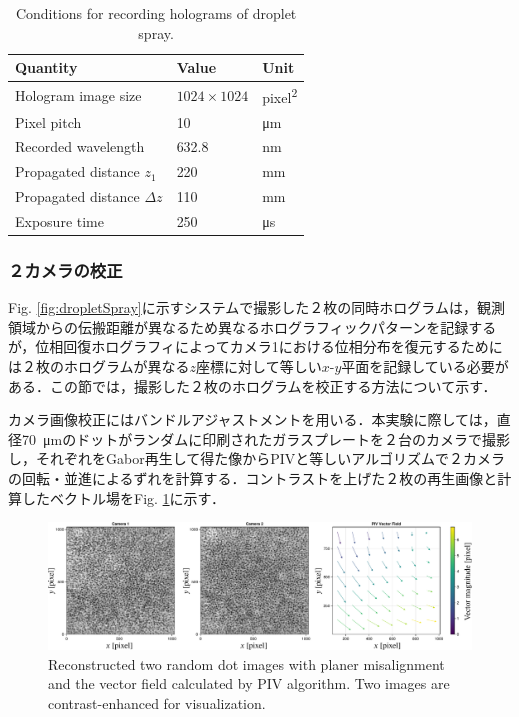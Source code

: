 \begin{table}[H]
    \centering
    \caption{Conditions for recording holograms of droplet spray.}
    \label{table:dropletSprayCondition}
    \begin{tabular}{lll}
    Quantity & Value & Unit \\ \hline \hline
    Hologram image size & $\num{1024} \times \num{1024}$ & \si{pixel\squared} \\ \hline
    Pixel pitch & \num{10} & \si{\um} \\ \hline
    Recorded wavelength & \num{632.8} & \si{\nm} \\ \hline
    Propagated distance $z_1$ & \num{220} & \si{\mm} \\ \hline
    Propagated distance $\Delta z$ & \num{110} & \si{\mm} \\ \hline
    Exposure time & \num{250} & \si{\us} \\ \hline

    \end{tabular}
\end{table}

\subsubsection{２カメラの校正}
Fig. \ref{fig:dropletSpray}に示すシステムで撮影した２枚の同時ホログラムは，観測領域からの伝搬距離が異なるため異なるホログラフィックパターンを記録するが，位相回復ホログラフィによってカメラ1における位相分布を復元するためには２枚のホログラムが異なる$z$座標に対して等しい$x$-$y$平面を記録している必要がある．この節では，撮影した２枚のホログラムを校正する方法について示す．

カメラ画像校正にはバンドルアジャストメント\cite{okamoto2014}を用いる．本実験に際しては，直径\SI{70}{\um}のドットがランダムに印刷されたガラスプレートを２台のカメラで撮影し，それぞれをGabor再生して得た像からPIV\cite{willert1991}と等しいアルゴリズムで２カメラの回転・並進によるずれを計算する．コントラストを上げた２枚の再生画像と計算したベクトル場をFig. \ref{fig:beforebundle}に示す．
\begin{figure}[H]
    \centering
    \includegraphics[width=0.98\linewidth]{./Figure/3_Methods/beforebundle.pdf}
    \caption{Reconstructed two random dot images with planer misalignment and the vector field calculated by PIV algorithm. Two images are contrast-enhanced for visualization.}
    \label{fig:beforebundle}
\end{figure}

